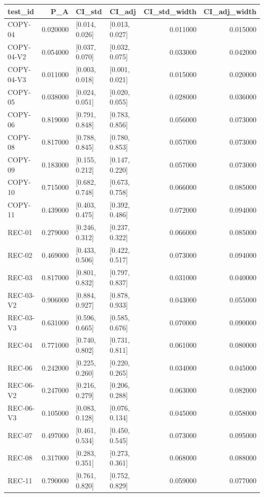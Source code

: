 \begin{tabular}{lrllrr}
\toprule
test_id & P_A & CI_std & CI_adj & CI_std_width & CI_adj_width \\
\midrule
COPY-04 & 0.020000 & [0.014, 0.026] & [0.013, 0.027] & 0.011000 & 0.015000 \\
COPY-04-V2 & 0.054000 & [0.037, 0.070] & [0.032, 0.075] & 0.033000 & 0.042000 \\
COPY-04-V3 & 0.011000 & [0.003, 0.018] & [0.001, 0.021] & 0.015000 & 0.020000 \\
COPY-05 & 0.038000 & [0.024, 0.051] & [0.020, 0.055] & 0.028000 & 0.036000 \\
COPY-06 & 0.819000 & [0.791, 0.848] & [0.783, 0.856] & 0.056000 & 0.073000 \\
COPY-08 & 0.817000 & [0.788, 0.845] & [0.780, 0.853] & 0.057000 & 0.073000 \\
COPY-09 & 0.183000 & [0.155, 0.212] & [0.147, 0.220] & 0.057000 & 0.073000 \\
COPY-10 & 0.715000 & [0.682, 0.748] & [0.673, 0.758] & 0.066000 & 0.085000 \\
COPY-11 & 0.439000 & [0.403, 0.475] & [0.392, 0.486] & 0.072000 & 0.094000 \\
REC-01 & 0.279000 & [0.246, 0.312] & [0.237, 0.322] & 0.066000 & 0.085000 \\
REC-02 & 0.469000 & [0.433, 0.506] & [0.422, 0.517] & 0.073000 & 0.094000 \\
REC-03 & 0.817000 & [0.801, 0.832] & [0.797, 0.837] & 0.031000 & 0.040000 \\
REC-03-V2 & 0.906000 & [0.884, 0.927] & [0.878, 0.933] & 0.043000 & 0.055000 \\
REC-03-V3 & 0.631000 & [0.596, 0.665] & [0.585, 0.676] & 0.070000 & 0.090000 \\
REC-04 & 0.771000 & [0.740, 0.802] & [0.731, 0.811] & 0.061000 & 0.080000 \\
REC-06 & 0.242000 & [0.225, 0.260] & [0.220, 0.265] & 0.034000 & 0.045000 \\
REC-06-V2 & 0.247000 & [0.216, 0.279] & [0.206, 0.288] & 0.063000 & 0.082000 \\
REC-06-V3 & 0.105000 & [0.083, 0.128] & [0.076, 0.134] & 0.045000 & 0.058000 \\
REC-07 & 0.497000 & [0.461, 0.534] & [0.450, 0.545] & 0.073000 & 0.095000 \\
REC-08 & 0.317000 & [0.283, 0.351] & [0.273, 0.361] & 0.068000 & 0.088000 \\
REC-11 & 0.790000 & [0.761, 0.820] & [0.752, 0.829] & 0.059000 & 0.077000 \\

\end{tabular}
